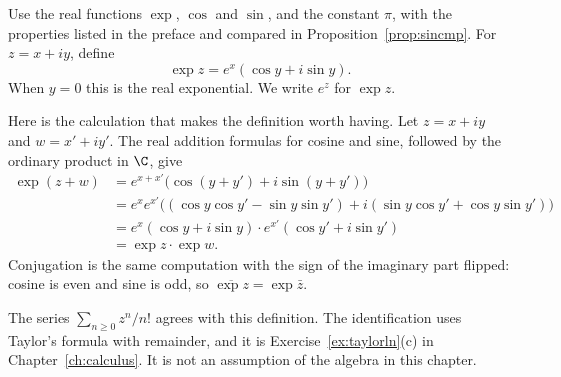 Use the real functions $\exp$, $\cos$ and $\sin$, and the constant $\pi$, with the properties listed in the preface and compared in Proposition~\ref{prop:sincmp}. For $z=x+iy$, define
\[
\exp z=e^x(\cos y+i\sin y).
\]
When $y=0$ this is the real exponential. We write $e^z$ for $\exp z$.

Here is the calculation that makes the definition worth having. Let $z=x+iy$ and $w=x'+iy'$. The real addition formulas for cosine and sine, followed by the ordinary product in $\C$, give
\begin{align*}
\exp(z+w)&=e^{x+x'}\bigl(\cos(y+y')+i\sin(y+y')\bigr)\\
&=e^xe^{x'}\bigl((\cos y\cos y'-\sin y\sin y')+i(\sin y\cos y'+\cos y\sin y')\bigr)\\
&=e^x(\cos y+i\sin y)\cdot e^{x'}(\cos y'+i\sin y')\\
&=\exp z\cdot\exp w.
\end{align*}
Conjugation is the same computation with the sign of the imaginary part flipped: cosine is even and sine is odd, so $\overline{\exp z}=\exp\bar z$.

The series $\sum_{n\ge0}z^n/n!$ agrees with this definition. The identification uses Taylor's formula with remainder, and it is Exercise~\ref{ex:taylorln}(c) in Chapter~\ref{ch:calculus}. It is not an assumption of the algebra in this chapter.

